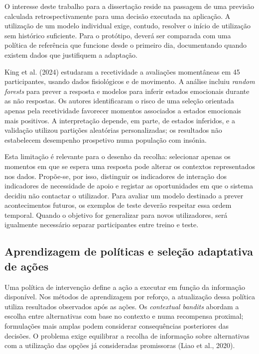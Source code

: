 O interesse deste trabalho para a dissertação reside na passagem de uma previsão calculada retrospectivamente para uma decisão executada na aplicação. A utilização de um modelo individual exige, contudo, resolver o início de utilização sem histórico suficiente. Para o protótipo, deverá ser comparada com uma política de referência que funcione desde o primeiro dia, documentando quando existem dados que justifiquem a adaptação.

King et al. (2024) estudaram a recetividade a avaliações momentâneas em 45 participantes, usando dados fisiológicos e de movimento. A análise incluiu \textit{random forests} para prever a resposta e modelos para inferir estados emocionais durante as não respostas. Os autores identificaram o risco de uma seleção orientada apenas pela recetividade favorecer momentos associados a estados emocionais mais positivos. A interpretação depende, em parte, de estados inferidos, e a validação utilizou partições aleatórias personalizadas; os resultados não estabelecem desempenho prospetivo numa população com insónia.

Esta limitação é relevante para o desenho da recolha: selecionar apenas os momentos em que se espera uma resposta pode alterar os contextos representados nos dados. Propõe-se, por isso, distinguir os indicadores de interação dos indicadores de necessidade de apoio e registar as oportunidades em que o sistema decidiu não contactar o utilizador. Para avaliar um modelo destinado a prever acontecimentos futuros, os exemplos de teste deverão respeitar essa ordem temporal. Quando o objetivo for generalizar para novos utilizadores, será igualmente necessário separar participantes entre treino e teste.

\subsection{Aprendizagem de políticas e seleção adaptativa de ações}
\label{sec:chap3_interventionPolicies}

Uma política de intervenção define a ação a executar em função da informação disponível. Nos métodos de aprendizagem por reforço, a atualização dessa política utiliza resultados observados após as ações. Os \textit{contextual bandits} abordam a escolha entre alternativas com base no contexto e numa recompensa proximal; formulações mais amplas podem considerar consequências posteriores das decisões. O problema exige equilibrar a recolha de informação sobre alternativas com a utilização das opções já consideradas promissoras (Liao et al., 2020).

